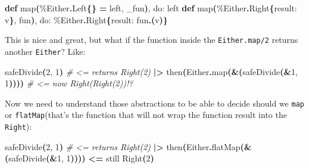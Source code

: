 \documentclass[
  oneside]{book}
\newenvironment{Shaded}{\begin{snugshade}}{\end{snugshade}}
\newcommand{\CommentTok}[1]{\textcolor[rgb]{0.56,0.35,0.01}{\textit{#1}}}
\newcommand{\ConstantTok}[1]{\textcolor[rgb]{0.56,0.35,0.01}{#1}}
\newcommand{\DecValTok}[1]{\textcolor[rgb]{0.00,0.00,0.81}{#1}}
\newcommand{\FunctionTok}[1]{\textcolor[rgb]{0.13,0.29,0.53}{\textbf{#1}}}
\newcommand{\KeywordTok}[1]{\textcolor[rgb]{0.13,0.29,0.53}{\textbf{#1}}}
\newcommand{\NormalTok}[1]{#1}
\newcommand{\OperatorTok}[1]{\textcolor[rgb]{0.81,0.36,0.00}{\textbf{#1}}}
\newcommand{\VariableTok}[1]{\textcolor[rgb]{0.00,0.00,0.00}{#1}}
\begin{document}
\begin{Shaded}
\begin{Highlighting}[]
\KeywordTok{def}\NormalTok{ map}\FunctionTok{(}\NormalTok{\%}\ConstantTok{Either}\OperatorTok{.}\ConstantTok{Left}\FunctionTok{\{\}} \OperatorTok{=}\NormalTok{ left, \_fun}\FunctionTok{)}\NormalTok{, }\VariableTok{do:}\NormalTok{ left}
\KeywordTok{def}\NormalTok{ map}\FunctionTok{(}\NormalTok{\%}\ConstantTok{Either}\OperatorTok{.}\ConstantTok{Right}\FunctionTok{\{}\VariableTok{result:}\NormalTok{ v}\FunctionTok{\}}\NormalTok{, fun}\FunctionTok{)}\NormalTok{, }\VariableTok{do:}\NormalTok{ \%}\ConstantTok{Either}\OperatorTok{.}\ConstantTok{Right}\FunctionTok{\{}\VariableTok{result:}\NormalTok{ fun}\OperatorTok{.}\FunctionTok{(}\NormalTok{v}\FunctionTok{)\}}
\end{Highlighting}
\end{Shaded}

This is nice and great, but what if the function inside the \texttt{Either.map/2} returns another \texttt{Either}? Like:

\begin{Shaded}
\begin{Highlighting}[]
\NormalTok{safeDivide}\FunctionTok{(}\DecValTok{2}\NormalTok{, }\DecValTok{1}\FunctionTok{)} \CommentTok{\# \textless{}= returns Right(2)}
\OperatorTok{|\textgreater{}}\NormalTok{ then}\FunctionTok{(}\ConstantTok{Either}\OperatorTok{.}\NormalTok{map}\FunctionTok{(}\OperatorTok{\&}\FunctionTok{(}\NormalTok{safeDivide}\FunctionTok{(}\OperatorTok{\&}\DecValTok{1}\NormalTok{, }\DecValTok{1}\FunctionTok{))))} \CommentTok{\# \textless{}= now Right(Right(2))!?}
\end{Highlighting}
\end{Shaded}

Now we need to understand those abstractions to be able to decide should we \texttt{map} or \texttt{flatMap}(that's the function that will not wrap the function result into the \texttt{Right}):

\begin{Shaded}
\begin{Highlighting}[]
\NormalTok{safeDivide}\FunctionTok{(}\DecValTok{2}\NormalTok{, }\DecValTok{1}\FunctionTok{)} \CommentTok{\# \textless{}= returns Right(2)}
\OperatorTok{|\textgreater{}}\NormalTok{ then}\FunctionTok{(}\ConstantTok{Either}\OperatorTok{.}\NormalTok{flatMap}\FunctionTok{(}\OperatorTok{\&}\FunctionTok{(}\NormalTok{safeDivide}\FunctionTok{(}\OperatorTok{\&}\DecValTok{1}\NormalTok{, }\DecValTok{1}\FunctionTok{))))} \OperatorTok{\textless{}=}\NormalTok{ still }\ConstantTok{Right}\FunctionTok{(}\DecValTok{2}\FunctionTok{)}
\end{Highlighting}
\end{Shaded}
\end{document}
